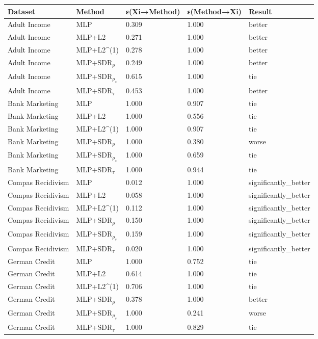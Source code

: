 \begin{tabular}{lllll}
\toprule
Dataset & Method & ε(Xi→Method) & ε(Method→Xi) & Result \\
\midrule
Adult Income & MLP & 0.309 & 1.000 & better \\
Adult Income & MLP+L2 & 0.271 & 1.000 & better \\
Adult Income & MLP+L2^{(1)} & 0.278 & 1.000 & better \\
Adult Income & MLP+SDR$_{\rho}$ & 0.249 & 1.000 & better \\
Adult Income & MLP+SDR$_{\rho_s}$ & 0.615 & 1.000 & tie \\
Adult Income & MLP+SDR$_{\tau}$ & 0.453 & 1.000 & better \\
Bank Marketing & MLP & 1.000 & 0.907 & tie \\
Bank Marketing & MLP+L2 & 1.000 & 0.556 & tie \\
Bank Marketing & MLP+L2^{(1)} & 1.000 & 0.907 & tie \\
Bank Marketing & MLP+SDR$_{\rho}$ & 1.000 & 0.380 & worse \\
Bank Marketing & MLP+SDR$_{\rho_s}$ & 1.000 & 0.659 & tie \\
Bank Marketing & MLP+SDR$_{\tau}$ & 1.000 & 0.944 & tie \\
Compas Recidivism & MLP & 0.012 & 1.000 & significantly_better \\
Compas Recidivism & MLP+L2 & 0.058 & 1.000 & significantly_better \\
Compas Recidivism & MLP+L2^{(1)} & 0.112 & 1.000 & significantly_better \\
Compas Recidivism & MLP+SDR$_{\rho}$ & 0.150 & 1.000 & significantly_better \\
Compas Recidivism & MLP+SDR$_{\rho_s}$ & 0.159 & 1.000 & significantly_better \\
Compas Recidivism & MLP+SDR$_{\tau}$ & 0.020 & 1.000 & significantly_better \\
German Credit & MLP & 1.000 & 0.752 & tie \\
German Credit & MLP+L2 & 0.614 & 1.000 & tie \\
German Credit & MLP+L2^{(1)} & 0.706 & 1.000 & tie \\
German Credit & MLP+SDR$_{\rho}$ & 0.378 & 1.000 & better \\
German Credit & MLP+SDR$_{\rho_s}$ & 1.000 & 0.241 & worse \\
German Credit & MLP+SDR$_{\tau}$ & 1.000 & 0.829 & tie \\
\bottomrule
\end{tabular}

